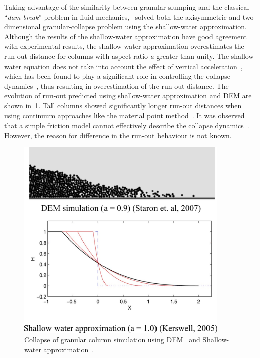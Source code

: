 Taking advantage 
of the similarity between granular slumping and the classical ``\textit{dam 
break}'' problem in fluid mechanics,~\citet{Kerswell2005} solved both the 
axisymmetric and two-dimensional granular-collapse problem using the 
shallow-water approximation. Although the results of the shallow-water 
approximation have good agreement with experimental results, the shallow-water 
approximation overestimates the run-out distance for columns with aspect ratio 
\textit{a} greater than unity. The shallow-water equation does not take into 
account the effect of vertical acceleration~\citep{Lajeunesse2005}, which has 
been found to play a significant role in controlling the collapse 
dynamics~\citep{Staron2007a}, thus resulting in overestimation of the run-out 
distance. The evolution of run-out predicted using shallow-water approximation 
and DEM are shown in~\cref{fig:DEM_Shallow}. Tall 
columns showed significantly longer run-out distances when using continuum 
approaches like the material point method~\citep{Bandara2013,Mast2014}. It was 
observed that a simple friction model cannot effectively describe the collapse 
dynamics~\citep{Staron2007a}. However, the reason for difference in the run-out 
behaviour is not known. 

\begin{figure}
\centering
\includegraphics[width=0.9\textwidth]{DEM_Shallow}
\caption[Collapse of granular column simulation using DEM
and Shallow-water approximation]{Collapse of granular column simulation using 
DEM~\citep{Staron2007a} and Shallow-water approximation~\citep{Kerswell2005}.}
\label{fig:DEM_Shallow}
\end{figure}

